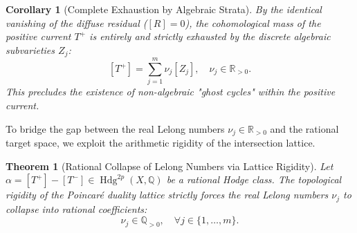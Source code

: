 \documentclass[11pt,a4paper]{article}
\theoremstyle{definition}
\theoremstyle{plain}
\newtheorem{theorem}[definition]{Theorem}
\newtheorem{corollary}[definition]{Corollary}
\DeclareMathOperator{\Hdg}{Hdg}
\begin{document}
\begin{corollary}[Complete Exhaustion by Algebraic Strata]
\label{cor:algebraic_strata_exhaustion}
By the identical vanishing of the diffuse residual ($[R] = 0$), the cohomological mass of the positive current $T^+$ is entirely and strictly exhausted by the discrete algebraic subvarieties $Z_j$:
\begin{equation}
    \label{eq:siu_decomposition_sum}
    [T^+] = \sum_{j=1}^m \nu_j [Z_j], \quad \nu_j \in \mathbb{R}_{>0}.
\end{equation}
This precludes the existence of non-algebraic "ghost cycles" within the positive current.
\end{corollary}

To bridge the gap between the real Lelong numbers $\nu_j \in \mathbb{R}_{>0}$ and the rational target space, we exploit the arithmetic rigidity of the intersection lattice.

\begin{theorem}[Rational Collapse of Lelong Numbers via Lattice Rigidity]
\label{thm:rational_lelong_collapse}
Let $\alpha = [T^+] - [T^-] \in \Hdg^{2p}(X, \mathbb{Q})$ be a rational Hodge class. The topological rigidity of the Poincaré duality lattice strictly forces the real Lelong numbers $\nu_j$ to collapse into rational coefficients:
\begin{equation}
    \label{eq:lelong_rationality}
    \nu_j \in \mathbb{Q}_{>0}, \quad \forall j \in \{1, \dots, m\}.
\end{equation}
\end{theorem}
\end{document}
